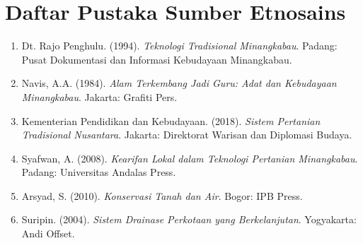 \documentclass[a4paper,12pt]{article}
\begin{document}
\section{Daftar Pustaka Sumber Etnosains}

\begin{enumerate}
\item Dt. Rajo Penghulu. (1994). \textit{Teknologi Tradisional Minangkabau}. Padang: Pusat Dokumentasi dan Informasi Kebudayaan Minangkabau.
\item Navis, A.A. (1984). \textit{Alam Terkembang Jadi Guru: Adat dan Kebudayaan Minangkabau}. Jakarta: Grafiti Pers.
\item Kementerian Pendidikan dan Kebudayaan. (2018). \textit{Sistem Pertanian Tradisional Nusantara}. Jakarta: Direktorat Warisan dan Diplomasi Budaya.
\item Syafwan, A. (2008). \textit{Kearifan Lokal dalam Teknologi Pertanian Minangkabau}. Padang: Universitas Andalas Press.
\item Arsyad, S. (2010). \textit{Konservasi Tanah dan Air}. Bogor: IPB Press.
\item Suripin. (2004). \textit{Sistem Drainase Perkotaan yang Berkelanjutan}. Yogyakarta: Andi Offset.
\end{enumerate}
\end{document}
